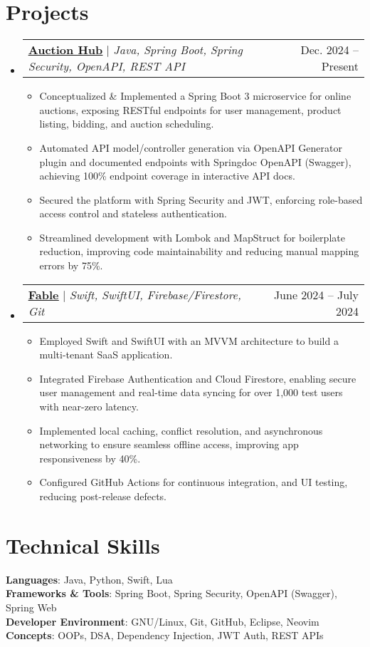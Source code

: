 \documentclass[a4paper,12pt]{article}
\makeatletter
\newcommand{\resumeItem}[1]{
  \item\small{
    {#1 \vspace{-2pt}}
  }
}
\newcommand{\resumeProjectHeading}[2]{
    \item
    \begin{tabular*}{0.97\textwidth}{l@{\extracolsep{\fill}}r}
      \small#1 & #2 \\
    \end{tabular*}\vspace{-7pt}
}
\newcommand{\resumeSubHeadingListStart}{\begin{itemize}[leftmargin=0.15in, label={}]}
\newcommand{\resumeSubHeadingListEnd}{\end{itemize}}
\newcommand{\resumeItemListStart}{\begin{itemize}}
\newcommand{\resumeItemListEnd}{\end{itemize}\vspace{-5pt}}
\makeatother
\begin{document}
\section{Projects}
    \resumeSubHeadingListStart
      \resumeProjectHeading
      {\textbf{\underline{\href{https://github.com/VanshajSaxena/auction-system}{Auction Hub}}} $|$ \emph{Java, Spring Boot, Spring Security, OpenAPI, REST API}}{Dec. 2024 -- Present}
          \resumeItemListStart
            \resumeItem{Conceptualized \& Implemented a Spring Boot 3 microservice for online auctions, exposing RESTful endpoints for user management, product listing, bidding, and auction scheduling.}
            \resumeItem{Automated API model/controller generation via OpenAPI Generator plugin and documented endpoints with Springdoc OpenAPI (Swagger), achieving 100\% endpoint coverage in interactive API docs. }
            \resumeItem{Secured the platform with Spring Security and JWT, enforcing role-based access control and stateless authentication.}
            \resumeItem{Streamlined development with Lombok and MapStruct for boilerplate reduction, improving code maintainability and reducing manual mapping errors by 75\%.}
          \resumeItemListEnd
      \resumeProjectHeading
      {\textbf{\underline{\href{https://github.com/VanshajSaxena/LMS_User}{Fable}}} $|$ \emph{Swift, SwiftUI, Firebase/Firestore, Git}}{June 2024 -- July 2024}
          \resumeItemListStart
            \resumeItem{Employed Swift and SwiftUI with an MVVM architecture to build a multi-tenant SaaS application.}
            \resumeItem{Integrated Firebase Authentication and Cloud Firestore, enabling secure user management and real-time data syncing for over 1,000 test users with near-zero latency.}
            \resumeItem{Implemented local caching, conflict resolution, and asynchronous networking to ensure seamless offline access, improving app responsiveness by 40\%.}
            \resumeItem{Configured GitHub Actions for continuous integration, and UI testing, reducing post-release defects.}
          \resumeItemListEnd
    \resumeSubHeadingListEnd



%
\section{Technical Skills}
 \begin{itemize}[leftmargin=0.15in, label={}]
    \small{\item{
     \textbf{Languages}{: Java, Python, Swift, Lua} \\
     \textbf{Frameworks \& Tools}{: Spring Boot, Spring Security, OpenAPI (Swagger), Spring Web} \\
     \textbf{Developer Environment}{: GNU/Linux, Git, GitHub, Eclipse, Neovim} \\
     \textbf{Concepts}{: OOPs, DSA, Dependency Injection, JWT Auth, REST APIs}
    }}
 \end{itemize}


\end{document}
